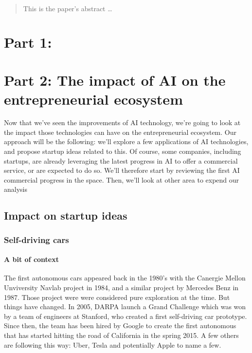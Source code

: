 \documentclass[12pt]{article}
\begin{document}
\maketitle

\begin{abstract}
This is the paper's abstract \ldots
\end{abstract}

\chapter{Part 1:}


\chapter{Part 2: The impact of AI on the entrepreneurial ecosystem}

Now that we've seen the improvements of AI technology, we're going to look at the impact those technologies can have on the entrepreneurial ecosystem. Our approach will be the following: we'll explore a few applications of AI technologies, and propose startup ideas related to this. 
Of course, some companies, including startups, are already leveraging the latest progress in AI to offer a commercial service, or are expected to do so. We'll therefore start by reviewing the first AI commercial progress in the space. Then, we'll look at other area to expend our analysis

\section{Impact on startup ideas}

\subsection{Self-driving cars}

\subsubsection{A bit of context}

The first autonomous cars appeared back in the 1980's with the Canergie Mellon Unviversity Navlab project in 1984, and a similar project by Mercedes Benz in 1987. Those project were were considered pure exploration at the time. But things have changed. In 2005, DARPA launch a Grand Challenge which was won by a team of engineers at Stanford, who created a first self-driving car prototype. Since then, the team has been hired by Google to create the first autonomous that has started hitting the road of California in the spring 2015. 
A few others are following this way: Uber, Tesla and potentially Apple to name a few.
\end{document}
